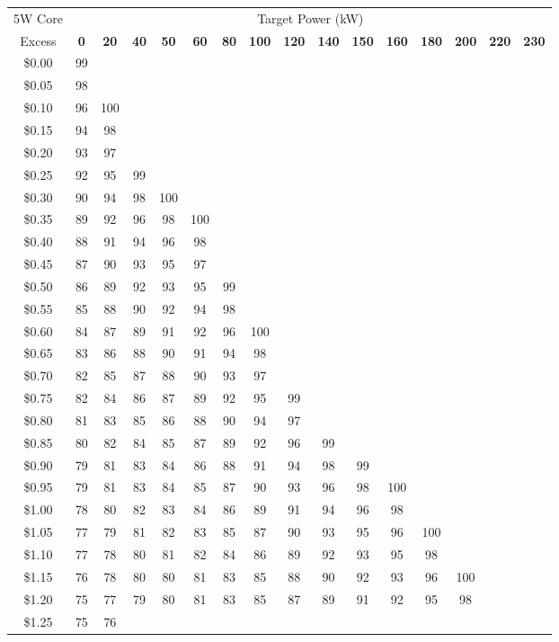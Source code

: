 \documentclass{article}
\begin{document}
\large
\centering

\renewcommand{\arraystretch}{1.2}
\begin{tabular}{|c|*{15}{c}|}
\hline
5W Core & \multicolumn{15}{c|}{Target Power (kW)} \\
Excess & \textbf{0} & \textbf{20} & \textbf{40} & \textbf{50} & \textbf{60} & \textbf{80} & \textbf{100} & \textbf{120} & \textbf{140} & \textbf{150} & \textbf{160} & \textbf{180} & \textbf{200} & \textbf{220} & \textbf{230}\\
\hline
\$0.00 & 99 &  &  &  &  &  &  &  &  &  &  &  &  &  & \\\$0.05 & 98 &  &  &  &  &  &  &  &  &  &  &  &  &  & \\\$0.10 & 96 & 100 &  &  &  &  &  &  &  &  &  &  &  &  & \\\$0.15 & 94 & 98 &  &  &  &  &  &  &  &  &  &  &  &  & \\\$0.20 & 93 & 97 &  &  &  &  &  &  &  &  &  &  &  &  & \\\$0.25 & 92 & 95 & 99 &  &  &  &  &  &  &  &  &  &  &  & \\\$0.30 & 90 & 94 & 98 & 100 &  &  &  &  &  &  &  &  &  &  & \\\$0.35 & 89 & 92 & 96 & 98 & 100 &  &  &  &  &  &  &  &  &  & \\\$0.40 & 88 & 91 & 94 & 96 & 98 &  &  &  &  &  &  &  &  &  & \\\$0.45 & 87 & 90 & 93 & 95 & 97 &  &  &  &  &  &  &  &  &  & \\\$0.50 & 86 & 89 & 92 & 93 & 95 & 99 &  &  &  &  &  &  &  &  & \\\$0.55 & 85 & 88 & 90 & 92 & 94 & 98 &  &  &  &  &  &  &  &  & \\\$0.60 & 84 & 87 & 89 & 91 & 92 & 96 & 100 &  &  &  &  &  &  &  & \\\$0.65 & 83 & 86 & 88 & 90 & 91 & 94 & 98 &  &  &  &  &  &  &  & \\\$0.70 & 82 & 85 & 87 & 88 & 90 & 93 & 97 &  &  &  &  &  &  &  & \\\$0.75 & 82 & 84 & 86 & 87 & 89 & 92 & 95 & 99 &  &  &  &  &  &  & \\\$0.80 & 81 & 83 & 85 & 86 & 88 & 90 & 94 & 97 &  &  &  &  &  &  & \\\$0.85 & 80 & 82 & 84 & 85 & 87 & 89 & 92 & 96 & 99 &  &  &  &  &  & \\\$0.90 & 79 & 81 & 83 & 84 & 86 & 88 & 91 & 94 & 98 & 99 &  &  &  &  & \\\$0.95 & 79 & 81 & 83 & 84 & 85 & 87 & 90 & 93 & 96 & 98 & 100 &  &  &  & \\\$1.00 & 78 & 80 & 82 & 83 & 84 & 86 & 89 & 91 & 94 & 96 & 98 &  &  &  & \\\$1.05 & 77 & 79 & 81 & 82 & 83 & 85 & 87 & 90 & 93 & 95 & 96 & 100 &  &  & \\\$1.10 & 77 & 78 & 80 & 81 & 82 & 84 & 86 & 89 & 92 & 93 & 95 & 98 &  &  & \\\$1.15 & 76 & 78 & 80 & 80 & 81 & 83 & 85 & 88 & 90 & 92 & 93 & 96 & 100 &  & \\\$1.20 & 75 & 77 & 79 & 80 & 81 & 83 & 85 & 87 & 89 & 91 & 92 & 95 & 98 &  & \\\$1.25 & 75 & 76 
\end{tabular}
\end{document}
